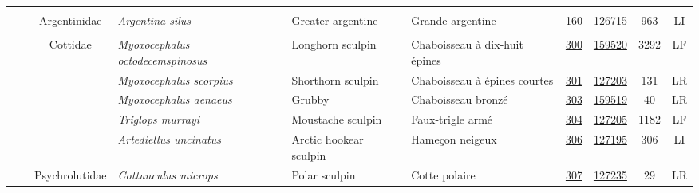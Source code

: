 \documentclass[12pt]{article}\usepackage[]{graphicx}\usepackage[]{color}
\begin{document}
\begin{landscapepage}
\begin{longtable}[t]{ccc>{\centering\arraybackslash}p{3cm}>{\centering\arraybackslash}p{3cm}>{\centering\arraybackslash}p{3cm}>{}c>{}ccc}
\nopagebreak
\addlinespace[0.3em]
\\
\hspace{1em}\hspace{1em} &  & Argentinidae & \em{Argentina silus} & Greater argentine & Grande argentine & \href{#sec:160}{160} & \href{http://www.marinespecies.org/aphia.php?p=taxdetails&id=126715}{126715} & 963 & LI\\
\nopagebreak
\addlinespace[0.3em]
\\
\hspace{1em}\hspace{1em} &  & Cottidae & \em{Myoxocephalus octodecemspinosus} & Longhorn sculpin & Chaboisseau à dix-huit épines & \href{#sec:300}{300} & \href{http://www.marinespecies.org/aphia.php?p=taxdetails&id=159520}{159520} & 3292 & LF\\
\nopagebreak
\hspace{1em}\hspace{1em} &  &  & \em{Myoxocephalus scorpius} & Shorthorn sculpin & Chaboisseau à épines courtes & \href{#sec:301}{301} & \href{http://www.marinespecies.org/aphia.php?p=taxdetails&id=127203}{127203} & 131 & LR\\
\nopagebreak
\hspace{1em}\hspace{1em} &  &  & \em{Myoxocephalus aenaeus} & Grubby & Chaboisseau bronzé & \href{#sec:303}{303} & \href{http://www.marinespecies.org/aphia.php?p=taxdetails&id=159519}{159519} & 40 & LR\\
\nopagebreak
\hspace{1em}\hspace{1em} &  &  & \em{Triglops murrayi} & Moustache sculpin & Faux-trigle armé & \href{#sec:304}{304} & \href{http://www.marinespecies.org/aphia.php?p=taxdetails&id=127205}{127205} & 1182 & LF\\
\nopagebreak
\hspace{1em}\hspace{1em} &  &  & \em{Artediellus uncinatus} & Arctic hookear sculpin & Hameçon neigeux & \href{#sec:306}{306} & \href{http://www.marinespecies.org/aphia.php?p=taxdetails&id=127195}{127195} & 306 & LI\\
\nopagebreak
\hspace{1em}\hspace{1em} &  & Psychrolutidae & \em{Cottunculus microps} & Polar sculpin & Cotte polaire & \href{#sec:307}{307} & \href{http://www.marinespecies.org/aphia.php?p=taxdetails&id=127235}{127235} & 29 & LR\\

\end{longtable}
\end{landscapepage}
\end{document}
